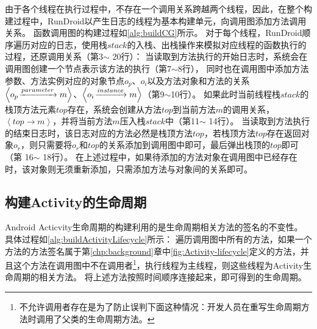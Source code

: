 
由于各个线程在执行过程中，不存在一个调用关系跨越两个线程，因此，在整个构建过程中，RunDroid以产生日志的线程为基本构建单元，向调用图添加方法调用关系。
函数调用图的构建过程如\autoref{alg:buildCG}所示。
对于每个线程，RunDroid顺序遍历对应的日志，使用栈$stack$的入栈、出栈操作来模拟对应线程的函数执行的过程，还原调用关系（第3$\sim$ 20行）：
当读取到方法执行的开始日志时，系统会在调用图创建一个节点表示该方法的执行（第7$\sim$8行），
同时也在调用图中添加方法参数、方法实例对应的对象节点$o_p$、$o_i$以及方法对象和方法的关系$ \left\langle  o_p \joinrel\xrightarrow{parameter}   m \right\rangle   $、$ \left\langle   o_i \joinrel\xrightarrow{instance}   m \right\rangle  $（第9$\sim$10行）。
如果此时当前线程栈$stack$的栈顶方法元素$top$存在，系统会创建从方法$top$到当前方法$m$的调用关系，$\left\langle top \to m \right \rangle  $，并将当前方法$m$压入栈$stack$中（第11$\sim$ 14行）。
当读取到方法执行的结束日志时，该日志对应的方法必然是栈顶方法$top$，若栈顶方法$top$存在返回对象$o_r$，则只需要将$o_r$和$top$的关系添加到调用图中即可，最后弹出栈顶的$top$即可（第 16$\sim$ 18行）。
在上述过程中，如果待添加的方法对象在调用图中已经存在时，该对象则无须重新添加，只需添加方法与对象间的关系即可。






\subsection{构建Activity的生命周期}

Android Acticvity生命周期的构建利用的是生命周期相关方法的签名的不变性。
具体过程如\autoref{alg:buildActivityLifecycle}所示：
遍历调用图中所有的方法，如果一个方法的方法签名属于第\ref{chp:background}章中\autoref{fig:Activity-lifecycle}定义的方法，并且这个方法在调用图中不在调用者\footnote{不允许调用者存在是为了防止误判下面这种情况：开发人员在重写生命周期方法时调用了父类的生命周期方法。}，执行线程为主线程，则这些线程为Activity生命周期的相关方法。
将上述方法按照时间顺序连接起来，即可得到的生命周期。


